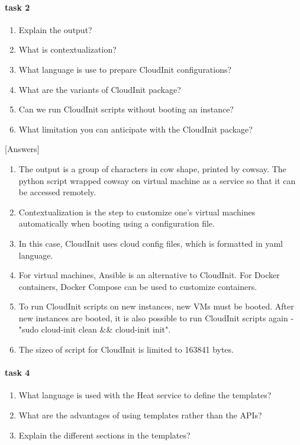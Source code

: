 \documentclass[a4paper,11pt]{article}
\begin{document}
\paragraph{task 2}
\begin{enumerate}
    \item Explain the output?
    \item What is contextualization?
    \item What language is use to prepare CloudInit configurations?
    \item What are the variants of CloudInit package?
    \item Can we run CloudInit scripts without booting an instance?
    \item What limitation you can anticipate with the CloudInit package?
\end{enumerate}
[Answers]
\begin{enumerate}
    \item The output is a group of characters in cow shape, printed by cowsay. The python script wrapped cowsay on virtual machine as a service so that it can be accessed remotely.  
    \item Contextualization is the step to customize one's virtual machines automatically when booting using a configuration file. 
    \item In this case, CloudInit uses cloud config files, which is formatted in yaml language. 
    \item For virtual machines, Ansible is an alternative to CloudInit. For Docker containers, Docker Compose can be used to customize containers. 
    \item To run CloudInit scripts on new instances, new VMs must be booted. After new instances are booted, it is also possible to run CloudInit scripts again - "sudo cloud-init clean \&\& cloud-init init". 
    \item The sizeo of script for CloudInit is limited to 163841 bytes. 
\end{enumerate}

\paragraph{task 4}
\begin{enumerate}
    \item What language is used with the Heat service to define the templates?
    \item What are the advantages of using templates rather than the APIs?
    \item Explain the different sections in the templates?
\end{enumerate}
\end{document}
